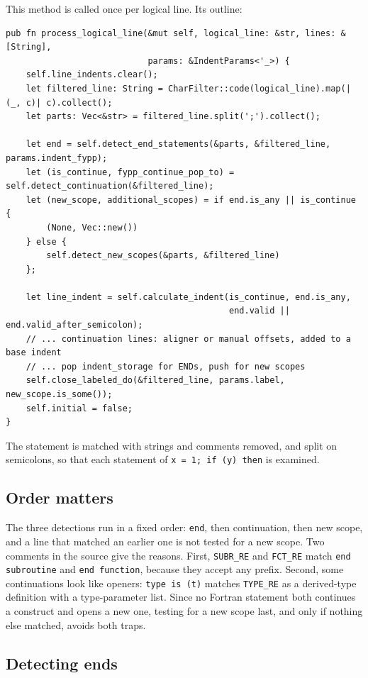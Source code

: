 \documentclass[11pt,a4paper,openany]{book}
\newcommand{\code}[1]{\texttt{\small #1}}
\begin{document}
This method is called once per logical line. Its outline:

\begin{lstlisting}[style=rust]
pub fn process_logical_line(&mut self, logical_line: &str, lines: &[String],
                            params: &IndentParams<'_>) {
    self.line_indents.clear();
    let filtered_line: String = CharFilter::code(logical_line).map(|(_, c)| c).collect();
    let parts: Vec<&str> = filtered_line.split(';').collect();

    let end = self.detect_end_statements(&parts, &filtered_line, params.indent_fypp);
    let (is_continue, fypp_continue_pop_to) = self.detect_continuation(&filtered_line);
    let (new_scope, additional_scopes) = if end.is_any || is_continue {
        (None, Vec::new())
    } else {
        self.detect_new_scopes(&parts, &filtered_line)
    };

    let line_indent = self.calculate_indent(is_continue, end.is_any,
                                            end.valid || end.valid_after_semicolon);
    // ... continuation lines: aligner or manual offsets, added to a base indent
    // ... pop indent_storage for ENDs, push for new scopes
    self.close_labeled_do(&filtered_line, params.label, new_scope.is_some());
    self.initial = false;
}
\end{lstlisting}

The statement is matched with strings and comments removed, and split on
semicolons, so that each statement of \code{x = 1; if (y) then} is examined.

\subsection{Order matters}\label{sec:indenter-order}

The three detections run in a fixed order: \code{end}, then continuation, then
new scope, and a line that matched an earlier one is not tested for a new scope.
Two comments in the source give the reasons. First, \code{SUBR\_RE} and
\code{FCT\_RE} match \code{end subroutine} and \code{end function}, because
they accept any prefix. Second, some continuations look like openers:
\code{type is (t)} matches \code{TYPE\_RE} as a derived-type definition with a
type-parameter list. Since no Fortran statement both continues a construct and
opens a new one, testing for a new scope last, and only if nothing else matched,
avoids both traps.

\subsection{Detecting ends}
\end{document}

